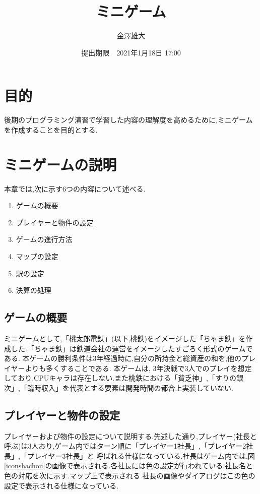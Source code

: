 \documentclass[a4j]{jarticle}
\title{ミニゲーム}
\date{提出期限　2021年1月18日 17:00}
\author{金澤雄大}
\begin{document}
    \maketitle
    \thispagestyle{empty}
    \clearpage
    \addtocounter{page}{-1}
    \section{目的}
    後期のプログラミング演習で学習した内容の理解度を高めるために,ミニゲームを作成することを目的とする.
    \section{ミニゲームの説明}
    本章では,次に示す6つの内容について述べる.
    \begin{enumerate}
        \item ゲームの概要
        \item プレイヤーと物件の設定
        \item ゲームの進行方法
        \item マップの設定
        \item 駅の設定
        \item 決算の処理
    \end{enumerate}    
    \subsection{ゲームの概要}
    ミニゲームとして,「桃太郎電鉄」\cite{mmtt}(以下,桃鉄)をイメージした「ちゃま鉄」を作成した.「ちゃま鉄」は鉄道会社の運営をイメージしたすごろく形式のゲームである.
    本ゲームの勝利条件は3年経過時に,自分の所持金と総資産の和を,他のプレイヤーよりも多くすることである.
    本ゲームは, 3年決戦で3人でのプレイを想定しており,CPUキャラは存在しない.また桃鉄における「貧乏神」,「すりの銀次」,「臨時収入」を代表とする要素は開発時間の都合上実装していない.

    \subsection{プレイヤーと物件の設定}
    プレイヤーおよび物件の設定について説明する.先述した通り,プレイヤー(社長と呼ぶ)は3人おり,ゲーム内ではターン順に「プレイヤー1社長」,「プレイヤー2社長」,「プレイヤー3社長」と
    呼ばれる仕様になっている.社長はゲーム内では,図\ref{iconshachou}の画像で表示される.各社長には色の設定が行われている.社長名と色の対応を次に示す.マップ上で表示される
    社長の画像やダイアログはこの色の設定で表示される仕様になっている.
\end{document}
